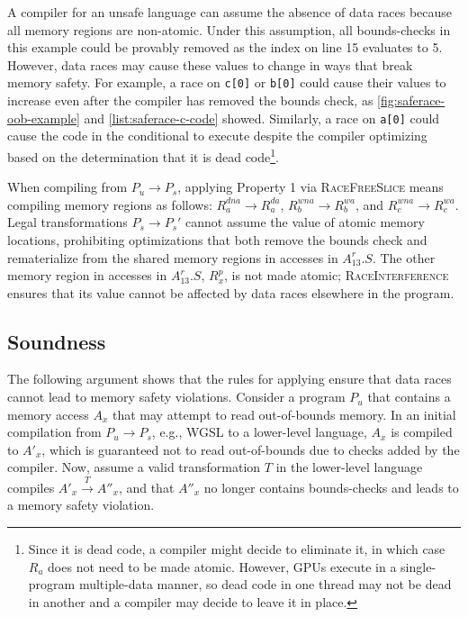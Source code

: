 A compiler for an unsafe language can assume the absence of data races because all memory regions are non-atomic. Under this assumption, all bounds-checks in this example could be provably removed as the index on line 15 evaluates to 5. However, data races may cause these values to change in ways that break memory safety. For example, a race on \texttt{c[0]} or \texttt{b[0]} could cause their values to increase even after the compiler has removed the bounds check, as \myfig\ref{fig:saferace-oob-example} and \mylisting\ref{list:saferace-c-code} showed. Similarly, a race on \texttt{a[0]} could cause the code in the conditional to execute despite the compiler optimizing based on the determination that it is dead code\footnote{Since it is dead code, a compiler might decide to eliminate it, in which case $R_a$ does not need to be made atomic. However, GPUs execute in a single-program multiple-data manner, so dead code in one thread may not be dead in another and a compiler may decide to leave it in place.}.

When compiling from $P_u \rightarrow P_s$, applying Property 1 via \textsc{RaceFreeSlice} means compiling memory regions as follows: $R^{dna}_a \rightarrow R^{da}_a$, $R^{wna}_b \rightarrow R^{wa}_b$, and $R^{wna}_c \rightarrow R^{wa}_c$. Legal transformations $P_s \rightarrow P_s'$ cannot assume the value of atomic memory locations, prohibiting optimizations that both remove the bounds check and rematerialize from the shared memory regions in accesses in $A^r_{13}.S$. The other memory region in accesses in $A^r_{13}.S$, $R^p_x$, is not made atomic; \textsc{RaceInterference} ensures that its value cannot be affected by data races elsewhere in the program.

\subsection{\smsg Soundness}

The following argument shows that the rules for applying \smsg ensure that data races cannot lead to memory safety violations. Consider a program $P_u$ that contains a memory access $A_x$ that may attempt to read out-of-bounds memory. In an initial compilation from $P_u \rightarrow P_s$, e.g., WGSL to a lower-level language, $A_x$ is compiled to $A'_x$, which is guaranteed not to read out-of-bounds due to checks added by the compiler. Now, assume a valid transformation $T$ in the lower-level language compiles $A'_x \xrightarrow{T} A''_x$, and that $A''_x$ no longer contains bounds-checks and leads to a memory safety violation.

